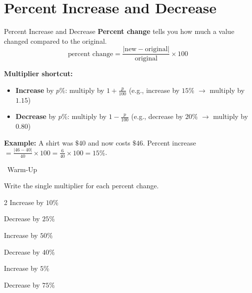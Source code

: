 \section{Percent Increase and Decrease}

\begin{quickReview}{Percent Increase and Decrease}
\textbf{Percent change} tells you how much a value changed compared to the original.
$$\text{percent change} = \frac{|\text{new} - \text{original}|}{\text{original}} \times 100$$

\textbf{Multiplier shortcut:}
\begin{itemize}[leftmargin=*]
    \item \textbf{Increase} by $p\%$: multiply by $1 + \frac{p}{100}$ \quad (e.g., increase by $15\%$ $\to$ multiply by $1.15$)
    \item \textbf{Decrease} by $p\%$: multiply by $1 - \frac{p}{100}$ \quad (e.g., decrease by $20\%$ $\to$ multiply by $0.80$)
\end{itemize}

\medskip
\textbf{Example:} A shirt was $\$40$ and now costs $\$46$. Percent increase $= \frac{|46 - 40|}{40} \times 100 = \frac{6}{40} \times 100 = 15\%$.
\end{quickReview}

\begin{practiceBox}[funGreen]{\faSun~Warm-Up}

Write the single multiplier for each percent change.

\begin{multicols}{2}
\prob Increase by $10\%$ \answerBlank[3cm]

\prob Decrease by $25\%$ \answerBlank[3cm]

\prob Increase by $50\%$ \answerBlank[3cm]

\prob Decrease by $40\%$ \answerBlank[3cm]

\prob Increase by $5\%$ \answerBlank[3cm]

\prob Decrease by $75\%$ \answerBlank[3cm]
\end{multicols}
\end{practiceBox}

